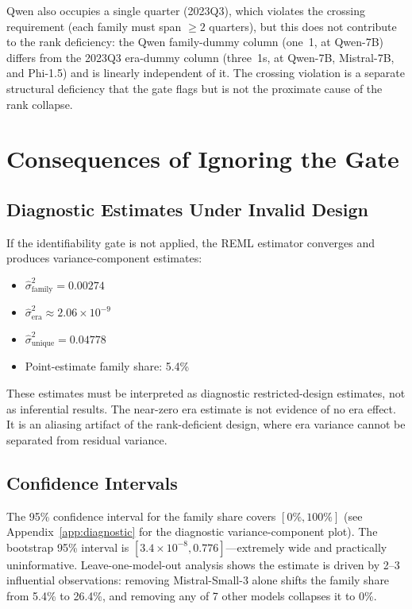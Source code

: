 \documentclass{ieeeaccess}
\theoremstyle{definition}
\theoremstyle{plain}
\begin{document}
Qwen also occupies a single quarter (2023Q3), which violates the crossing requirement (each family must span $\geq 2$ quarters), but this does not contribute to the rank deficiency: the Qwen family-dummy column (one~1, at Qwen-7B) differs from the 2023Q3 era-dummy column (three~1s, at Qwen-7B, Mistral-7B, and Phi-1.5) and is linearly independent of it. The crossing violation is a separate structural deficiency that the gate flags but is not the proximate cause of the rank collapse.

\section{Consequences of Ignoring the Gate}
\label{sec:consequences}

\subsection{Diagnostic Estimates Under Invalid Design}
If the identifiability gate is not applied, the REML estimator converges and produces variance-component estimates:
\begin{itemize}
\item $\hat{\sigma}^2_{\text{family}} = 0.00274$
\item $\hat{\sigma}^2_{\text{era}} \approx 2.06 \times 10^{-9}$
\item $\hat{\sigma}^2_{\text{unique}} = 0.04778$
\item Point-estimate family share: 5.4\%
\end{itemize}
These estimates must be interpreted as diagnostic restricted-design estimates, not as inferential results. The near-zero era estimate is not evidence of no era effect. It is an aliasing artifact of the rank-deficient design, where era variance cannot be separated from residual variance.

\subsection{Confidence Intervals}
The 95\% confidence interval for the family share covers $[0\%, 100\%]$ (see Appendix~\ref{app:diagnostic} for the diagnostic variance-component plot). The bootstrap 95\% interval is $[3.4 \times 10^{-8}, 0.776]$---extremely wide and practically uninformative. Leave-one-model-out analysis shows the estimate is driven by 2--3 influential observations: removing Mistral-Small-3 alone shifts the family share from 5.4\% to 26.4\%, and removing any of 7 other models collapses it to 0\%.
\end{document}
